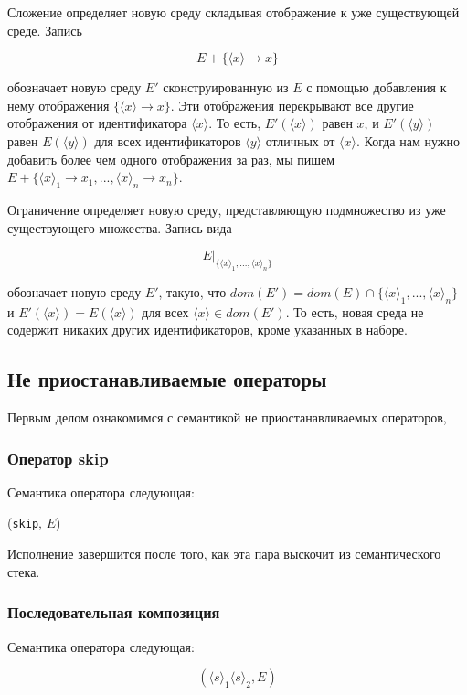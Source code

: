 Сложение определяет новую среду складывая отображение к уже существующей среде. Запись

$$E + \{ \langle x \rangle \to  x \}$$

обозначает новую среду $E'$ сконструированную из $E$ с помощью добавления к нему отображения $\{ \langle x \rangle \to x \}$. Эти отображения перекрывают все другие отображения от идентификатора $\langle x \rangle$. То есть, $E'( \langle x \rangle)$ равен $x$, и $E'( \langle y \rangle)$ равен $E( \langle y \rangle)$ для всех идентификаторов $\langle y \rangle$ отличных от $\langle x \rangle$. Когда нам нужно добавить более чем одного отображения за раз, мы пишем $E+ \{ {\langle x \rangle}_{1} \to {x}_{1}, ..., {\langle x \rangle}_{n} \to {x}_{n}\}$.

Ограничение определяет новую среду, представляющую подмножество из уже существующего множества. Запись вида

$$E|_{ \{ {\langle x \rangle}_{1} ,..., { \langle x \rangle}_{n} \}}$$

обозначает новую среду $E'$, такую, что $dom(E') = dom(E) \cap  \{ { \langle x \rangle }_{1} , ..., {\langle x \rangle}_{n} \}$ и $E'(\langle x \rangle) = E(\langle x \rangle)$ для всех $\langle x \rangle \in  dom(E')$. То есть, новая среда не содержит никаких других идентификаторов, кроме указанных в наборе.

\subsection{Не приостанавливаемые операторы}

Первым делом ознакомимся с семантикой не приостанавливаемых операторов,

\subsubsection{Оператор skip}

Семантика оператора следующая:

(\lstinline|skip|, $E$)


Исполнение завершится после того, как эта пара выскочит из семантического стека.

\subsubsection{Последовательная композиция}

Семантика оператора следующая:


$$( {\langle s \rangle}_{1} {\langle s \rangle}_{2}, E)$$


